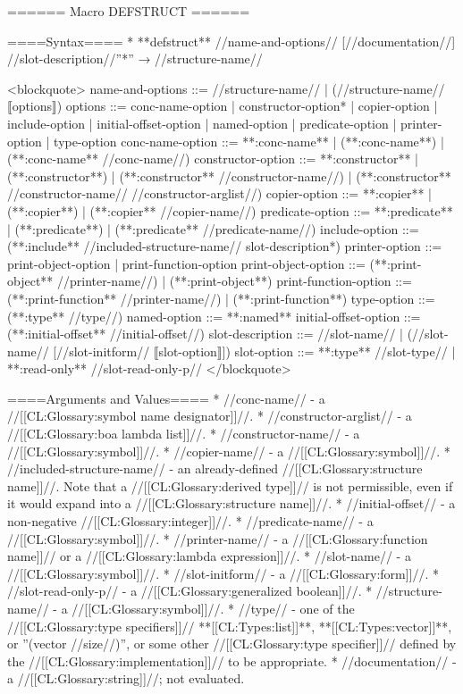 ====== Macro DEFSTRUCT ======

====Syntax====
  * **defstruct** //name-and-options// [//documentation//] //slot-description//''*'' → //structure-name//

<blockquote>
name-and-options ::= //structure-name// | (//structure-name// ⟦options⟧)
options ::= conc-name-option |
            {constructor-option}* |
            copier-option |
            include-option |
            initial-offset-option |
            named-option |
            predicate-option |
            printer-option |
            type-option
conc-name-option ::= **:conc-name** | 
                     (**:conc-name**) | 
                     (**:conc-name** //conc-name//)
constructor-option ::= **:constructor** |
                       (**:constructor**) |
                       (**:constructor** //constructor-name//) |
                       (**:constructor** //constructor-name// //constructor-arglist//)
copier-option ::= **:copier** | 
                  (**:copier**) | 
                  (**:copier** //copier-name//)
predicate-option ::= **:predicate** | 
                     (**:predicate**) | 
                     (**:predicate** //predicate-name//)
include-option ::= (**:include** //included-structure-name// {slot-description*})
printer-option ::= print-object-option | 
                   print-function-option
print-object-option ::= (**:print-object** //printer-name//) | (**:print-object**)
print-function-option ::= (**:print-function** //printer-name//) | (**:print-function**)
type-option ::= (**:type** //type//)
named-option ::= **:named**
initial-offset-option ::= (**:initial-offset** //initial-offset//)
slot-description ::= //slot-name// | 
                     (//slot-name// [//slot-initform// ⟦slot-option⟧])
slot-option ::= **:type** //slot-type// | 
                **:read-only** //slot-read-only-p//
</blockquote>

====Arguments and Values====
  * //conc-name// - a //[[CL:Glossary:symbol name designator]]//.
  * //constructor-arglist// - a //[[CL:Glossary:boa lambda list]]//.
  * //constructor-name// - a //[[CL:Glossary:symbol]]//.
  * //copier-name// - a //[[CL:Glossary:symbol]]//.
  * //included-structure-name// - an already-defined //[[CL:Glossary:structure name]]//. Note that a //[[CL:Glossary:derived type]]// is not permissible, even if it would expand into a //[[CL:Glossary:structure name]]//.
  * //initial-offset// - a non-negative //[[CL:Glossary:integer]]//.
  * //predicate-name// - a //[[CL:Glossary:symbol]]//.
  * //printer-name// - a //[[CL:Glossary:function name]]// or a //[[CL:Glossary:lambda expression]]//.
  * //slot-name// - a //[[CL:Glossary:symbol]]//.
  * //slot-initform// - a //[[CL:Glossary:form]]//.
  * //slot-read-only-p// - a //[[CL:Glossary:generalized boolean]]//.
  * //structure-name// - a //[[CL:Glossary:symbol]]//.
  * //type// - one of the //[[CL:Glossary:type specifiers]]// **[[CL:Types:list]]**, **[[CL:Types:vector]]**, or ''(vector //size//)'', or some other //[[CL:Glossary:type specifier]]// defined by the //[[CL:Glossary:implementation]]// to be appropriate.
  * //documentation// - a //[[CL:Glossary:string]]//; not evaluated.

